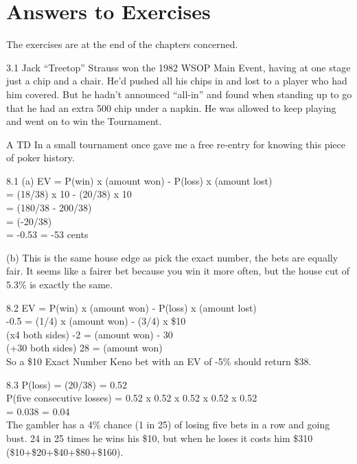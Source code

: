 \chapter{Answers to Exercises}

The exercises are at the end of the chapters concerned.


3.1 Jack ``Treetop'' Strauss won the 1982 WSOP Main Event,
having at one stage just a chip and a chair. He'd
pushed all his chips in and lost to a player who had him
covered. But he hadn't announced ``all-in'' and found when standing up
to go that he had an extra 500 chip under a napkin. He was allowed to
keep playing and went on to win the Tournament.

A TD In a small tournament once gave me a free re-entry for knowing
this piece of poker history.

8.1 (a) EV = P(win) x (amount won) - P(loss) x (amount lost) \\
= (18/38) x 10 - (20/38) x 10 \\
= (180/38 - 200/38) \\
= (-20/38) \\
= -0.53 = -53 cents

(b) This is the same house edge as pick the exact number, the bets are
equally fair. It seems like a fairer bet because you win it more
often, but the house cut of 5.3\% is exactly the same.

8.2 EV = P(win) x (amount won) - P(loss) x (amount lost) \\
-0.5  = (1/4)  x (amount won) - (3/4) x \$10 \\
(x4 both sides) -2 = (amount won) - 30 \\
(+30 both sides) 28 = (amount won) \\

So a \$10 Exact Number Keno bet with an EV of -5\% should return
\$38.

8.3 P(loss) = (20/38) = 0.52 \\
P(five consecutive losses)  = 0.52 x 0.52 x 0.52 x 0.52 x 0.52 \\
= 0.038 = 0.04 \\

The gambler has a 4\% chance (1 in 25) of losing five bets in a row
and going bust. 24 in 25 times he wins his \$10, but when he loses it
costs him \$310 (\$10+\$20+\$40+\$80+\$160).

